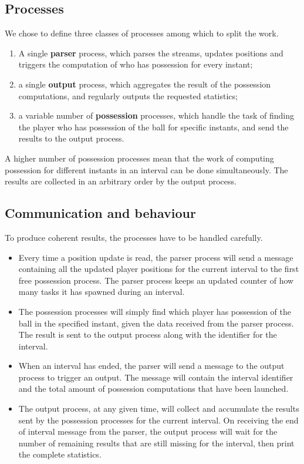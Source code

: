 \documentclass[a4paper]{article}
\begin{document}
\subsection{Processes}
We chose to define three classes of processes among which to split the work.

\begin{enumerate}
	\item A single \textbf{parser} process, which parses the streams, updates positions and triggers the computation of who has possession for every instant;
\item a single \textbf{output} process, which aggregates the result of the possession computations, and regularly outputs the requested statistics;
\item a variable number of \textbf{possession} processes, which handle the task of finding the player who has possession of the ball for specific instants, and send the results to the output process.
\end{enumerate}

A higher number of possession processes mean that the work of computing possession for different instants in an interval can be done simultaneously. The results are collected in an arbitrary order by the output process.

\subsection{Communication and behaviour}
To produce coherent results, the processes have to be handled carefully.

\begin{itemize}
	\item Every time a position update is read, the parser process will send a message containing all the updated player positions for the current interval to the first free possession process. The parser process keeps an updated counter of how many tasks it has spawned during an interval.
\item The possession processes will simply find which player has possession of the ball in the specified instant, given the data received from the parser process. The result is sent to the output process along with the identifier for the interval.
\item When an interval has ended, the parser will send a message to the output process to trigger an output. The message will contain the interval identifier and the total amount of possession computations that have been launched.
\item The output process, at any given time, will collect and accumulate the results sent by the possession processes for the current interval. On receiving the end of interval message from the parser, the output process will wait for the number of remaining results that are still missing for the interval, then print the complete statistics.
\end{itemize}
\end{document}
